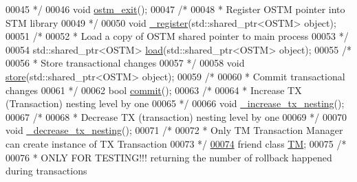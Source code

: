 \begin{DoxyCode}
00045 \textcolor{comment}{     */}
00046     \textcolor{keywordtype}{void} \hyperlink{class_t_x_aa9739c5c2077454c779098db7baefc2b_aa9739c5c2077454c779098db7baefc2b}{ostm\_exit}();
00047     \textcolor{comment}{/*}
00048 \textcolor{comment}{     *  Register OSTM pointer into STM library }
00049 \textcolor{comment}{     */}
00050     \textcolor{keywordtype}{void} \hyperlink{class_t_x_abc32af2f51df97ac483e5bfe7db6ca6e_abc32af2f51df97ac483e5bfe7db6ca6e}{\_register}(std::shared\_ptr<OSTM>  \textcolor{keywordtype}{object});
00051     \textcolor{comment}{/*}
00052 \textcolor{comment}{     * Load a copy of OSTM shared pointer to main process }
00053 \textcolor{comment}{     */}
00054     std::shared\_ptr<OSTM>  \hyperlink{class_t_x_a1d78262b8831ddd042ed491f2e600e24_a1d78262b8831ddd042ed491f2e600e24}{load}(std::shared\_ptr<OSTM>  \textcolor{keywordtype}{object});
00055     \textcolor{comment}{/*}
00056 \textcolor{comment}{     * Store transactional changes}
00057 \textcolor{comment}{     */}
00058     \textcolor{keywordtype}{void} \hyperlink{class_t_x_a7dbcb369aa4a3370b6c6829d278ece5d_a7dbcb369aa4a3370b6c6829d278ece5d}{store}(std::shared\_ptr<OSTM>  \textcolor{keywordtype}{object});
00059     \textcolor{comment}{/*}
00060 \textcolor{comment}{     * Commit transactional changes}
00061 \textcolor{comment}{     */}
00062     \textcolor{keywordtype}{bool} \hyperlink{class_t_x_a9dde5d356b35e557448e58d260087356_a9dde5d356b35e557448e58d260087356}{commit}();
00063     \textcolor{comment}{/*}
00064 \textcolor{comment}{     * Increase TX (Transaction) nesting level by one}
00065 \textcolor{comment}{     */}
00066     \textcolor{keywordtype}{void} \hyperlink{class_t_x_a1384bdf12d795854b5d32e7f61ffbdb8_a1384bdf12d795854b5d32e7f61ffbdb8}{\_increase\_tx\_nesting}();
00067     \textcolor{comment}{/*}
00068 \textcolor{comment}{     * Decrease TX (transaction) nesting level by one}
00069 \textcolor{comment}{     */}
00070     \textcolor{keywordtype}{void} \hyperlink{class_t_x_aa3ac499f576326588628ade96b27b4b1_aa3ac499f576326588628ade96b27b4b1}{\_decrease\_tx\_nesting}();
00071     \textcolor{comment}{/*}
00072 \textcolor{comment}{     * Only TM Transaction Manager can create instance of TX Transaction}
00073 \textcolor{comment}{     */}
\hypertarget{_t_x_8h_source.tex_l00074}{}\hyperlink{class_t_x_adf1ccda799ef5c419cb43b8ae55eb45c_adf1ccda799ef5c419cb43b8ae55eb45c}{00074}     \textcolor{keyword}{friend} \textcolor{keyword}{class }\hyperlink{class_t_m}{TM};
00075     \textcolor{comment}{/*}
00076 \textcolor{comment}{     * ONLY FOR TESTING!!! returning the number of rollback happened during transactions}

\end{DoxyCode}
